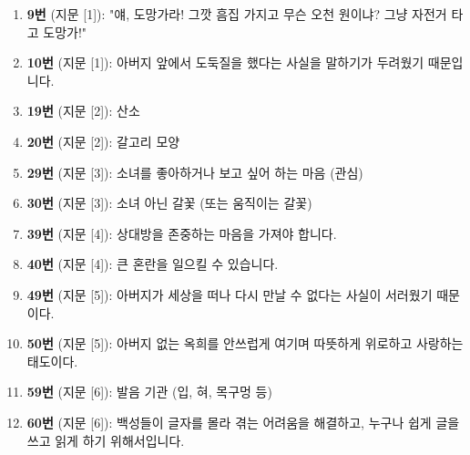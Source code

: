 \documentclass[11pt, a4paper]{article}
\begin{document}
\vspace{2mm}

\begin{enumerate}[label={}, leftmargin=0em, itemsep=2pt]
\item \textbf{9번} (지문 [1]): "얘, 도망가라! 그깟 흠집 가지고 무슨 오천 원이냐? 그냥 자전거 타고 도망가!"
\item \textbf{10번} (지문 [1]): 아버지 앞에서 도둑질을 했다는 사실을 말하기가 두려웠기 때문입니다.
\item \textbf{19번} (지문 [2]): 산소
\item \textbf{20번} (지문 [2]): 갈고리 모양
\item \textbf{29번} (지문 [3]): 소녀를 좋아하거나 보고 싶어 하는 마음 (관심)
\item \textbf{30번} (지문 [3]): 소녀 아닌 갈꽃 (또는 움직이는 갈꽃)
\item \textbf{39번} (지문 [4]): 상대방을 존중하는 마음을 가져야 합니다.
\item \textbf{40번} (지문 [4]): 큰 혼란을 일으킬 수 있습니다.
\item \textbf{49번} (지문 [5]): 아버지가 세상을 떠나 다시 만날 수 없다는 사실이 서러웠기 때문이다.
\item \textbf{50번} (지문 [5]): 아버지 없는 옥희를 안쓰럽게 여기며 따뜻하게 위로하고 사랑하는 태도이다.
\item \textbf{59번} (지문 [6]): 발음 기관 (입, 혀, 목구멍 등)
\item \textbf{60번} (지문 [6]): 백성들이 글자를 몰라 겪는 어려움을 해결하고, 누구나 쉽게 글을 쓰고 읽게 하기 위해서입니다.
\end{enumerate}
\end{document}

